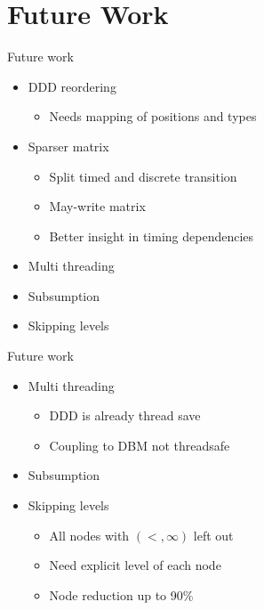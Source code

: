 \section{Future Work}

\begin{frame}{Future work}
\begin{itemize}
	\item DDD reordering
	\begin{itemize}
		\item Needs mapping of positions and types
	\end{itemize}
	\item Sparser matrix
	\begin{itemize}
		\item Split timed and discrete transition
		\item May-write matrix
		\item Better insight in timing dependencies
	\end{itemize}
	\item Multi threading
	\item Subsumption
	\item Skipping levels
\end{itemize}
\end{frame}

\begin{frame}{Future work}
\begin{itemize}
	\item Multi threading
	\begin{itemize}
		\item DDD is already thread save
		\item Coupling to DBM not threadsafe
	\end{itemize}
	\item Subsumption
	\item Skipping levels
	\begin{itemize}
		\item All nodes with $(<,\infty)$ left out
		\item Need explicit level of each node
		\item Node reduction up to 90\%	
	\end{itemize}
\end{itemize}
\end{frame}



